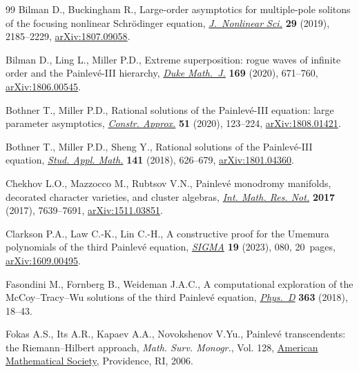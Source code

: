 \documentclass[11pt]{article}
\numberwithin{equation}{section}
\numberwithin{equation}{section}
\begin{document}
\begin{thebibliography}{99}
Bilman D., Buckingham R., Large-order asymptotics for multiple-pole solitons of
 the focusing nonlinear {S}chr\"odinger equation, \href{https://doi.org/10.1007/s00332-019-09542-7}{\textit{J.~Nonlinear Sci.}}
 \textbf{29} (2019), 2185--2229, \href{https://arxiv.org/abs/1807.09058}{arXiv:1807.09058}.

Bilman D., Ling L., Miller P.D., Extreme superposition: rogue waves of infinite
 order and the {P}ainlev\'e-{III} hierarchy, \href{https://doi.org/10.1215/00127094-2019-0066}{\textit{Duke Math.~J.}}
 \textbf{169} (2020), 671--760, \href{https://arxiv.org/abs/1806.00545}{arXiv:1806.00545}.

Bothner T., Miller P.D., Rational solutions of the {P}ainlev\'e-{III} equation:
 large parameter asymptotics, \href{https://doi.org/10.1007/s00365-019-09463-4}{\textit{Constr. Approx.}} \textbf{51} (2020),
 123--224, \href{https://arxiv.org/abs/1808.01421}{arXiv:1808.01421}.

Bothner T., Miller P.D., Sheng Y., Rational solutions of the {P}ainlev\'e-{III}
 equation, \href{https://doi.org/10.1111/sapm.12220}{\textit{Stud. Appl. Math.}} \textbf{141} (2018), 626--679,
 \href{https://arxiv.org/abs/1801.04360}{arXiv:1801.04360}.

Chekhov L.O., Mazzocco M., Rubtsov V.N., Painlev\'e monodromy manifolds,
 decorated character varieties, and cluster algebras, \href{https://doi.org/10.1093/imrn/rnw219}{\textit{Int. Math. Res.
 Not.}} \textbf{2017} (2017), 7639--7691, \href{https://arxiv.org/abs/1511.03851}{arXiv:1511.03851}.

Clarkson P.A., Law C.-K., Lin C.-H., A constructive proof for the {U}memura
 polynomials of the third {P}ainlev\'e equation, \href{https://doi.org/10.3842/SIGMA.2023.080}{\textit{SIGMA}} \textbf{19}
 (2023), 080, 20~pages, \href{https://arxiv.org/abs/1609.00495}{arXiv:1609.00495}.

Fasondini M., Fornberg B., Weideman J.A.C., A computational exploration of the
 {M}c{C}oy--{T}racy--{W}u solutions of the third {P}ainlev\'e equation,
 \href{https://doi.org/10.1016/j.physd.2017.10.011}{\textit{Phys.~D}} \textbf{363} (2018), 18--43.

Fokas A.S., Its A.R., Kapaev A.A., Novokshenov V.Yu., Painlev\'e transcendents:
 the {R}iemann--{H}ilbert approach, \textit{Math. Surv. Monogr.}, Vol. 128,
 \href{https://doi.org/10.1090/surv/128}{American Mathematical Society}, Providence, RI, 2006.


\end{thebibliography}
\end{document}
